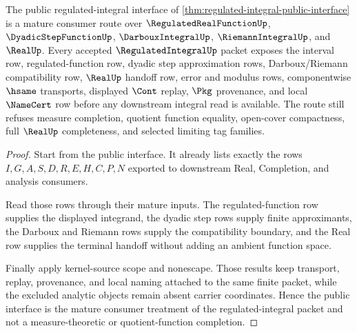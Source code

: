 \begin{theorem}
\label{thm:regulated-integral-mature-treatment}
The public regulated-integral interface of \autoref{thm:regulated-integral-public-interface} is a mature consumer route over $\RegulatedRealFunctionUp$, $\DyadicStepFunctionUp$, $\DarbouxIntegralUp$, $\RiemannIntegralUp$, and $\RealUp$. Every accepted $\RegulatedIntegralUp$ packet exposes the interval row, regulated-function row, dyadic step approximation rows, Darboux/Riemann compatibility row, $\RealUp$ handoff row, error and modulus rows, componentwise $\hsame$ transports, displayed $\Cont$ replay, $\Pkg$ provenance, and local $\NameCert$ row before any downstream integral read is available. The route still refuses measure completion, quotient function equality, open-cover compactness, full $\RealUp$ completeness, and selected limiting tag families.
\end{theorem}
\begin{proof}
Start from the public interface. It already lists exactly the rows $I,G,A,S,D,R,E,H,C,P,N$ exported to downstream Real, Completion, and analysis consumers.

Read those rows through their mature inputs. The regulated-function row supplies the displayed integrand, the dyadic step rows supply finite approximants, the Darboux and Riemann rows supply the compatibility boundary, and the Real row supplies the terminal handoff without adding an ambient function space.

Finally apply kernel-source scope and nonescape. Those results keep transport, replay, provenance, and local naming attached to the same finite packet, while the excluded analytic objects remain absent carrier coordinates. Hence the public interface is the mature consumer treatment of the regulated-integral packet and not a measure-theoretic or quotient-function completion.
\end{proof}


